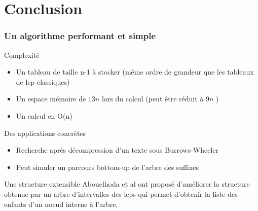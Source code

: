 \documentclass[10pt]{beamer}
\begin{document}




\section{Conclusion}
\label{sec:conclusion}

\begin{frame}
  \frametitle{Un algorithme performant et simple}

  \begin{block}{Complexité}
    \begin{itemize}
    \item Un tableau de taille n-1 à stocker (même ordre de grandeur que les
      tableaux de lcp classiques)
    \item Un espace mémoire de $13n $ lors du calcul (peut être réduit à $9n$ \cite{Manzini04})
    \item Un calcul en O(n)
    \end{itemize}
  \end{block}

  \pause

  \begin{block}{Des applications concrètes}
    \begin{itemize}
    \item Recherche après décompression d'un texte sous Burrows-Wheeler
    \item Peut simuler un parcours bottom-up de l'arbre des suffixes
    \end{itemize}
  \end{block}

  \pause

  \begin{block}{Une structure extensible}
    Abouelhoda et al\cite{Abouelhoda200453} ont proposé d'améliorer la structure obtenue par
    un arbre d'intervalles des lcps qui permet d'obtenir la liste des
    enfants d'un noeud interne à l'arbre.
  \end{block}

\end{frame}
\end{document}
